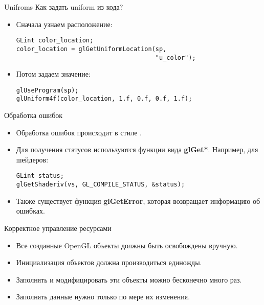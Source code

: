 \documentclass{beamer}
\begin{document}
\begin{frame}[fragile]{Unifroms}
    Как задать uniform из кода?
    \begin{itemize}
        \item Сначала узнаем расположение:
            {\small \begin{lstlisting}
GLint color_location;
color_location = glGetUniformLocation(sp,
                                      "u_color");
            \end{lstlisting}}
        \item Потом задаем значение:
            {\small \begin{lstlisting}
glUseProgram(sp);
glUniform4f(color_location, 1.f, 0.f, 0.f, 1.f);
            \end{lstlisting}}
    \end{itemize}
\end{frame}

\begin{frame}[fragile]{Обработка ошибок}
    \begin{itemize}
        \item Обработка ошибок происходит в стиле \langc.
        \item Для получения статусов используются функции вида {\bf glGet*}. 
            Например, для шейдеров:
            {\small \begin{lstlisting}
GLint status;
glGetShaderiv(vs, GL_COMPILE_STATUS, &status);
            \end{lstlisting}}
        \item Также существует функция {\bf glGetError}, 
            которая возвращает информацию об ошибках.
    \end{itemize}
\end{frame}

\begin{frame}[fragile]{Корректное управление ресурсами}
    \begin{itemize}
        \item Все созданные OpenGL объекты должны быть освобождены вручную.
        \item Инициализация объектов должна производиться единожды.
        \item Заполнять и модифицировать эти объекты можно бесконечно много раз.
        \item Заполнять данные нужно только по мере их изменения.
    \end{itemize}
\end{frame}
\end{document}
